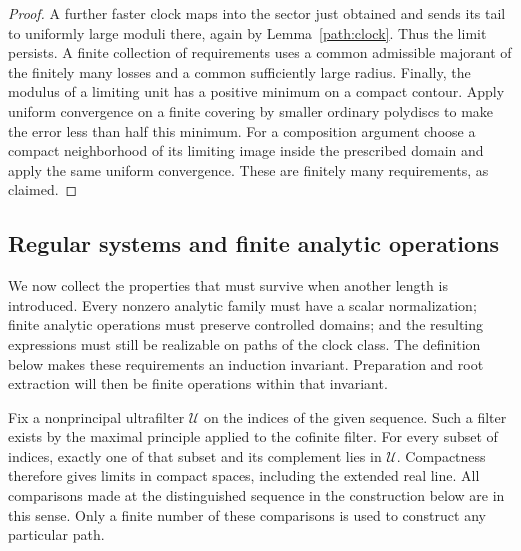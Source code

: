 \begin{proof}
A further faster clock maps into the sector just obtained and sends
its tail to uniformly large moduli there, again by
Lemma~\ref{path:clock}.  Thus the limit persists.  A finite collection
of requirements uses a common admissible majorant of the finitely
many losses and a common sufficiently large radius.  Finally, the
modulus of a limiting unit has a positive minimum on a compact
contour.  Apply uniform convergence on a finite covering by smaller
ordinary polydiscs to make the error less than half this minimum.
For a composition argument choose a compact neighborhood of its
limiting image inside the prescribed domain and apply the same
uniform convergence.  These are finitely many requirements, as
claimed.
\end{proof}

\subsection{Regular systems and finite analytic operations}

We now collect the properties that must survive when another length is
introduced. Every nonzero analytic family must have a scalar
normalization; finite analytic operations must preserve controlled
domains; and the resulting expressions must still be realizable on
paths of the clock class. The definition below makes these requirements
an induction invariant. Preparation and root extraction will then be
finite operations within that invariant.

Fix a nonprincipal ultrafilter \(\mathcal U\) on the indices of the
given sequence.  Such a filter exists by the maximal principle applied
to the cofinite filter.  For every subset of indices, exactly one of
that subset and its complement lies in \(\mathcal U\).  Compactness
therefore gives limits in compact spaces, including the extended real
line.  All comparisons made at the distinguished sequence in the
construction below are in this sense.  Only a finite number of these
comparisons is used to construct any particular path.

